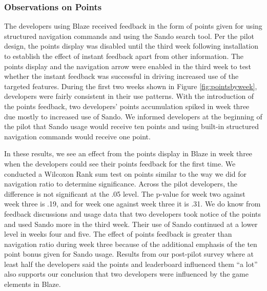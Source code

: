 \documentclass{sig-alternate}
\begin{document}
\subsubsection{Observations on Points}

The developers using Blaze received feedback in the form of points given for using structured navigation commands and using the Sando search tool\cite{Shepherd2012Sando}.  Per the pilot design, the points display was disabled until the third week following installation to establish the effect of instant feedback apart from other information.  The points display and the navigation arrow were enabled in the third week to test whether the instant feedback was successful in driving increased use of the targeted features. During the first two weeks shown in Figure \ref{fig:pointsbyweek}, developers were fairly consistent in their use patterns.  With the introduction of the points feedback, two developers' points accumulation spiked in week three due mostly to increased use of Sando.   We informed developers at the beginning of the pilot that Sando usage would receive ten points and using built-in structured navigation commands would receive one point.  

In these results, we see an effect from the points display in Blaze in week three when the developers could see their points feedback for the first time.  We conducted a Wilcoxon Rank sum test on points similar to the way we did for navigation ratio to determine significance.  Across the pilot developers, the difference is not significant at the .05 level. The p-value for week two against week three is .19, and for week one against week three it is .31.  We do know from feedback discussions and usage data that two developers took notice of the points and used Sando more in the third week.  Their use of Sando continued at a lower level in weeks four and five.   The effect of points feedback is greater than navigation ratio during week three because of the additional emphasis of the ten point bonus given for Sando usage.  Results from our post-pilot survey where at least half the developers said the points and leaderboard influenced them ``a lot'' also supports our conclusion that two developers were influenced by the game elements in Blaze.  
\end{document}

